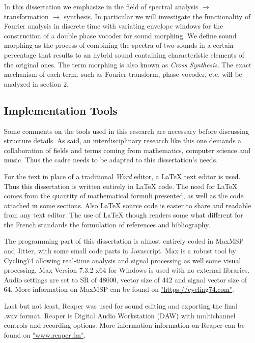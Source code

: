 In this dissertation we emphasize in the field of spectral analysis $\to$ transformation $\to$ synthesis. In particular we will investigate the functionality of Fourier analysis in discrete time with variating envelope windows for the construction of a double phase vocoder for sound morphing. We define sound morphing as the process of combining the spectra of two sounds in a certain percentage that results to an hybrid sound containing characteristic elements of the original ones. The term morphing is also known as \textit{Cross Synthesis}. The exact mechanism of each term, such as Fourier transform, phase vocoder, etc, will be analyzed in section 2. 


\subsection{Implementation Tools}

Some comments on the tools used in this research are necessary before discussing structure details. As said, an interdisciplinary research like this one demands a collaboration of fields and terms coming from mathematics, computer science and music. Thus the cadre needs to be adapted to this dissertation's needs.

For the text in place of a traditional \textit{Word} editor, a \LaTeX{} text editor is used. Thus this dissertation is written entirely in \LaTeX{} code. The need for \LaTeX{} comes from the quantity of mathematical formuli presented, as well as the code attached in some sections. Also \LaTeX{} source code is easier to share and readable from any text editor. The use of \LaTeX{} though renders some what different for the French standards the formulation of references and bibliography. 

The programming part of this dissertation is almost entirely coded in MaxMSP and Jitter, with some small code parts in Javascript. Max is a robust tool by Cycling74 allowing real-time analysis and signal processing as well some visual processing. Max Version 7.3.2 x64 for Windows is used with no external libraries. Audio settings are set to SR of 48000, vector size of 442 and signal vector size of 64. More information on MaxMSP can be found on \href{https://cycling74.com/products/max/}{"https://cycling74.com"}.

Last but not least, Reaper was used for sound editing and exporting the final .wav format. Reaper is Digital Audio Workstation (DAW) with multichannel controls and recording options. More information information on Reaper can be found on \href{https://www.reaper.fm/}{"www.reaper.fm"}.

